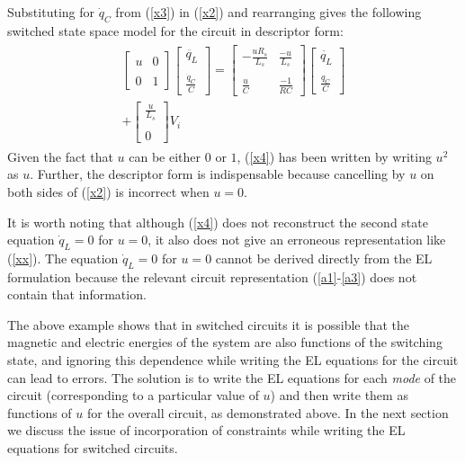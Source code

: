 \documentclass[preprint,12pt]{elsarticle}
\begin{document}
Substituting for $\dot{q}_C$ from (\ref{x3}) in (\ref{x2}) and rearranging gives the following switched state space model for the circuit in descriptor form:
\begin{eqnarray}\label{x4}
\begin{split}
\left[\begin{array}{cc}u&0\\ \\0&1\end{array}\right]
\left[\begin{array}{c}
\ddot{q_L}\\ \\
\frac{\dot{q}_C}{C}
\end{array}\right]=\left[\begin{array}{cc}-\frac{uR_s}{L_s}&\frac{-u}{L_s}\\ \\\frac{u}{C}&\frac{-1}{RC}\end{array}\right]\left[\begin{array}{c}
\dot{q_L}\\ \\
\frac{q_C}{C}\end{array}\right] \\ +\left[\begin{array}{c}
\frac{u}{L_s}\\ \\
0
\end{array}\right]V_i
\end{split}
\end{eqnarray}
Given the fact that $u$ can be either $0$ or $1$, (\ref{x4}) has been written by writing $u^2$ as $u$. Further, the descriptor form is indispensable because cancelling by $u$ on both sides of (\ref{x2}) is incorrect when $u=0$.

It is worth noting that although (\ref{x4}) does not reconstruct the second state equation $\dot{q}_L=0$ for $u=0$, it also does not give an erroneous representation like (\ref{xx}). The equation $\dot{q}_L=0$ for $u=0$ cannot be derived directly from the EL formulation because the relevant circuit representation (\ref{a1}-\ref{a3}) does not contain that information.

The above example shows that in switched circuits it is possible that the magnetic and electric energies of the system are also functions of the switching state, and ignoring this dependence while writing the EL equations for the circuit can lead to errors. The solution is to write the EL equations for each \textit{mode} of the circuit (corresponding to a particular value of $u$) and then write them as functions of $u$ for the overall circuit, as demonstrated above. In the next section we discuss the issue of incorporation of constraints while writing the EL equations for switched circuits.
\end{document}
